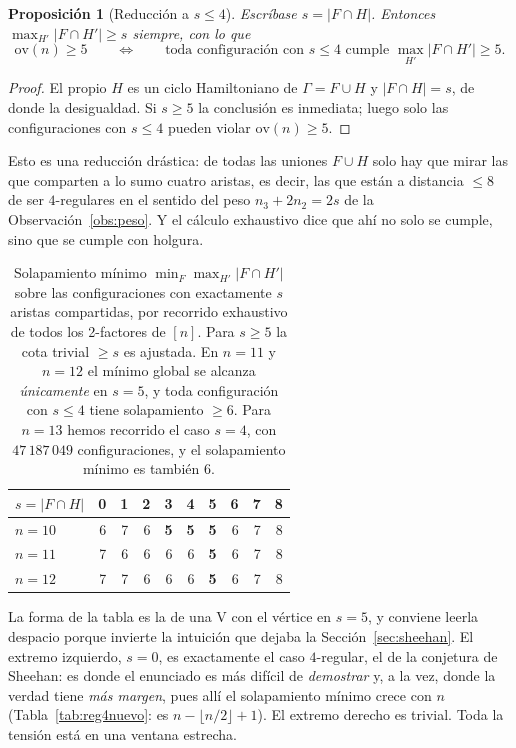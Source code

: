 \documentclass[11pt,a4paper]{article}
\newtheorem{proposicion}[teorema]{Proposición}
\theoremstyle{definition}
\theoremstyle{remark}
\begin{document}
\begin{proposicion}[Reducción a $s\le4$]\label{prop:ventana}
Escríbase $s=|F\cap H|$. Entonces $\max_{H'}|F\cap H'|\ge s$ siempre, con lo que
\[
\mathrm{ov}(n)\ge5
\qquad\Longleftrightarrow\qquad
\text{toda configuración con } s\le4 \text{ cumple } \max_{H'}|F\cap H'|\ge5 .
\]
\end{proposicion}

\begin{proof}
El propio $H$ es un ciclo Hamiltoniano de $\Gamma=F\cup H$ y $|F\cap H|=s$, de donde la desigualdad. Si $s\ge5$ la conclusión es inmediata; luego solo las configuraciones con $s\le4$ pueden violar $\mathrm{ov}(n)\ge5$.
\end{proof}

Esto es una reducción drástica: de todas las uniones $F\cup H$ solo hay que mirar las que comparten a lo sumo cuatro aristas, es decir, las que están a distancia $\le8$ de ser $4$-regulares en el sentido del peso $n_3+2n_2=2s$ de la Observación~\ref{obs:peso}. Y el cálculo exhaustivo dice que ahí no solo se cumple, sino que se cumple con holgura.

\begin{table}[h]
\centering
\begin{tabular}{lrrrrrrrrr}
\toprule
$s=|F\cap H|$ & 0 & 1 & 2 & 3 & 4 & 5 & 6 & 7 & 8\\
\midrule
$n=10$ & 6 & 7 & 6 & \textbf{5} & \textbf{5} & \textbf{5} & 6 & 7 & 8\\
$n=11$ & 7 & 6 & 6 & 6 & 6 & \textbf{5} & 6 & 7 & 8\\
$n=12$ & 7 & 7 & 6 & 6 & 6 & \textbf{5} & 6 & 7 & 8\\
\bottomrule
\end{tabular}
\caption{Solapamiento mínimo $\min_{F}\max_{H'}|F\cap H'|$ sobre las configuraciones con exactamente $s$ aristas compartidas, por recorrido exhaustivo de todos los 2-factores de $[n]$. Para $s\ge5$ la cota trivial $\ge s$ es ajustada. En $n=11$ y $n=12$ el mínimo global se alcanza \emph{únicamente} en $s=5$, y toda configuración con $s\le4$ tiene solapamiento $\ge6$. Para $n=13$ hemos recorrido el caso $s=4$, con $47\,187\,049$ configuraciones, y el solapamiento mínimo es también $6$.}\label{tab:pors}
\end{table}

La forma de la tabla es la de una V con el vértice en $s=5$, y conviene leerla despacio porque invierte la intuición que dejaba la Sección~\ref{sec:sheehan}. El extremo izquierdo, $s=0$, es exactamente el caso $4$-regular, el de la conjetura de Sheehan: es donde el enunciado es más difícil de \emph{demostrar} y, a la vez, donde la verdad tiene \emph{más margen}, pues allí el solapamiento mínimo crece con $n$ (Tabla~\ref{tab:reg4nuevo}: es $n-\lfloor n/2\rfloor+1$). El extremo derecho es trivial. Toda la tensión está en una ventana estrecha.
\end{document}
